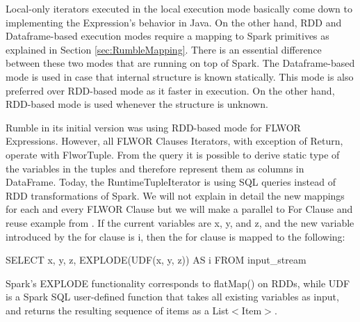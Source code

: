 Local-only iterators executed in the local execution mode basically come down to implementing the Expression's behavior in Java. On the other hand, RDD and Dataframe-based execution modes require a mapping to Spark primitives as explained in Section \ref{sec:RumbleMapping}. There is an essential difference between these two modes that are running on top of Spark. The Dataframe-based mode is used in case that internal structure is known statically. This mode is also preferred over RDD-based mode as it faster in execution. On the other hand, RDD-based mode is used whenever the structure is unknown. 

Rumble in its initial version was using RDD-based mode for FLWOR Expressions. However, all FLWOR Clauses Iterators, with exception of Return, operate with FlworTuple. From the query it is possible to derive static type of the variables in the tuples and therefore represent them as columns in DataFrame. Today, the RuntimeTupleIterator is using SQL queries instead of RDD transformations of Spark. We will not explain in detail the new mappings for each and every FLWOR Clause but we will make a parallel to For Clause and reuse example from \cite{RumblePaper}. If the current variables are x, y, and z, and the new variable introduced by the for clause is i, then the for clause is mapped to the following:

SELECT x, y, z, EXPLODE(UDF(x, y, z)) AS i FROM input\_stream

Spark’s EXPLODE functionality corresponds to flatMap() on RDDs, while UDF is a Spark SQL user-defined function that takes all existing variables as input, and returns the resulting sequence of items as a List$<$Item$>$.

